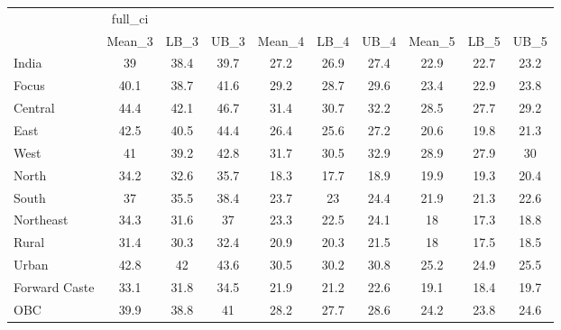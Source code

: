 \begin{tabular}{l*{9}{c}}
\toprule
                    &     full\_ci&            &            &            &            &            &            &            &            \\
                    &      Mean\_3&        LB\_3&        UB\_3&      Mean\_4&        LB\_4&        UB\_4&      Mean\_5&        LB\_5&        UB\_5\\
\midrule
India               &          39&        38.4&        39.7&        27.2&        26.9&        27.4&        22.9&        22.7&        23.2\\
Focus               &        40.1&        38.7&        41.6&        29.2&        28.7&        29.6&        23.4&        22.9&        23.8\\
Central             &        44.4&        42.1&        46.7&        31.4&        30.7&        32.2&        28.5&        27.7&        29.2\\
East                &        42.5&        40.5&        44.4&        26.4&        25.6&        27.2&        20.6&        19.8&        21.3\\
West                &          41&        39.2&        42.8&        31.7&        30.5&        32.9&        28.9&        27.9&          30\\
North               &        34.2&        32.6&        35.7&        18.3&        17.7&        18.9&        19.9&        19.3&        20.4\\
South               &          37&        35.5&        38.4&        23.7&          23&        24.4&        21.9&        21.3&        22.6\\
Northeast           &        34.3&        31.6&          37&        23.3&        22.5&        24.1&          18&        17.3&        18.8\\
Rural               &        31.4&        30.3&        32.4&        20.9&        20.3&        21.5&          18&        17.5&        18.5\\
Urban               &        42.8&          42&        43.6&        30.5&        30.2&        30.8&        25.2&        24.9&        25.5\\
Forward Caste       &        33.1&        31.8&        34.5&        21.9&        21.2&        22.6&        19.1&        18.4&        19.7\\
OBC                 &        39.9&        38.8&          41&        28.2&        27.7&        28.6&        24.2&        23.8&        24.6\\

\end{tabular}
